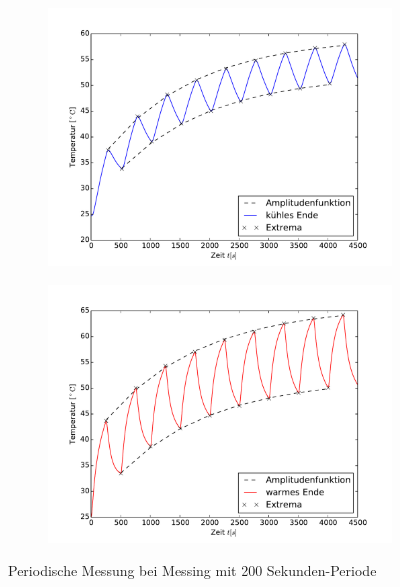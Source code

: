\begin{figure}[htp]
	\label{fig:M3Messing}
	\centering
	\begin{subfigure}{0.9\textwidth}
	\includegraphics[width=\textwidth]{Bilder/M3_Messing_kuehl.pdf}
	\end{subfigure}
	\begin{subfigure}{0.9\textwidth}
	\includegraphics[width=\textwidth]{Bilder/M3_Messing_warm.pdf}
	\end{subfigure}
	\caption{Periodische Messung bei Messing mit 200 Sekunden-Periode}
\end{figure}
